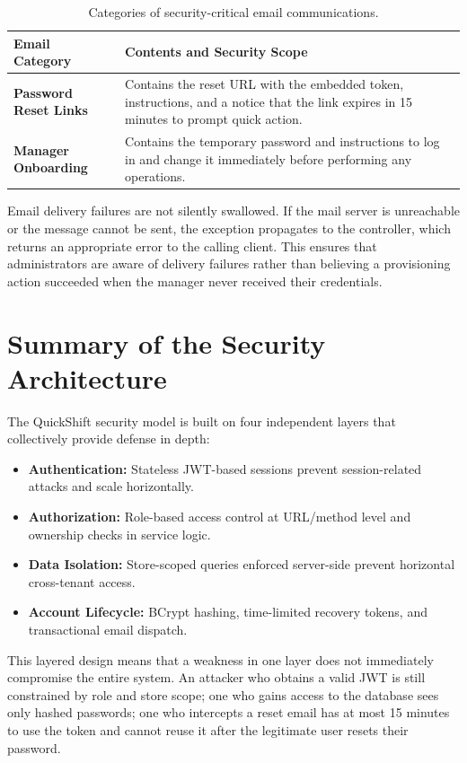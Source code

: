 \begin{table}[H]
\centering
\caption{Categories of security-critical email communications.}
\begin{tabular}{|p{4.5cm}|p{9.5cm}|}
\hline
\textbf{Email Category} & \textbf{Contents and Security Scope} \\ \hline
\textbf{Password Reset Links} & Contains the reset URL with the embedded token, instructions, and a notice that the link expires in 15 minutes to prompt quick action. \\ \hline
\textbf{Manager Onboarding} & Contains the temporary password and instructions to log in and change it immediately before performing any operations. \\ \hline
\end{tabular}
\label{tab:email_categories}
\end{table}

\par Email delivery failures are not silently swallowed. If the mail server is unreachable or the message cannot be sent, the exception propagates to the controller, which returns an appropriate error to the calling client. This ensures that administrators are aware of delivery failures rather than believing a provisioning action succeeded when the manager never received their credentials.

\section{Summary of the Security Architecture}
\par The QuickShift security model is built on four independent layers that collectively provide defense in depth:

\begin{itemize}
    \item \textbf{Authentication:} Stateless JWT-based sessions prevent session-related attacks and scale horizontally.
    \item \textbf{Authorization:} Role-based access control at URL/method level and ownership checks in service logic.
    \item \textbf{Data Isolation:} Store-scoped queries enforced server-side prevent horizontal cross-tenant access.
    \item \textbf{Account Lifecycle:} BCrypt hashing, time-limited recovery tokens, and transactional email dispatch.
\end{itemize}

\par This layered design means that a weakness in one layer does not immediately compromise the entire system. An attacker who obtains a valid JWT is still constrained by role and store scope; one who gains access to the database sees only hashed passwords; one who intercepts a reset email has at most 15 minutes to use the token and cannot reuse it after the legitimate user resets their password.